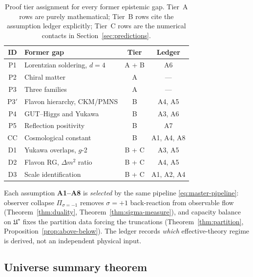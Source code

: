 \begin{table}[ht]
\centering
\small
\renewcommand{\arraystretch}{1.12}
\begin{tabular}{@{}clcc@{}}
\toprule
\textbf{ID} & \textbf{Former gap} & \textbf{Tier} & \textbf{Ledger} \\
\midrule
P1 & Lorentzian soldering, $d=4$ & A + B & A6 \\
P2 & Chiral matter & A & --- \\
P3 & Three families & A & --- \\
P3$'$ & Flavon hierarchy, CKM/PMNS & B & A4, A5 \\
P4 & GUT--Higgs and Yukawa & B & A3, A6 \\
P5 & Reflection positivity & B & A7 \\
CC & Cosmological constant & B & A1, A4, A8 \\
D1 & Yukawa overlaps, $g$-2 & B + C & A3, A5 \\
D2 & Flavon RG, $\Delta m^2$ ratio & B + C & A4, A5 \\
D3 & Scale identification & B + C & A1, A2, A4 \\
\bottomrule
\end{tabular}
\caption{Proof tier assignment for every former epistemic gap. Tier~A rows are
purely mathematical; Tier~B rows cite the assumption ledger explicitly; Tier~C
rows are the numerical contacts in Section~\ref{sec:predictions}.}
\label{tab:proof-tier-ledger}
\end{table}

\begin{remark}
Each assumption \textbf{A1--A8} is \emph{selected} by the same pipeline
\eqref{eq:master-pipeline}: observer collapse $\Pi_{\sigma=-1}$ removes
$\sigma=+1$ back-reaction from observable flow (Theorem~\ref{thm:duality},
Theorem~\ref{thm:sigma-measure}), and capacity balance on $\mathfrak{U}^\star$
fixes the partition data forcing the truncations (Theorem~\ref{thm:partition},
Proposition~\ref{prop:above-below}). The ledger records \emph{which}
effective-theory regime is derived, not an independent physical input.
\end{remark}

\subsection{Universe summary theorem}
\label{sec:universe-summary}

